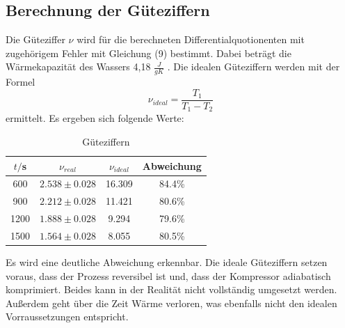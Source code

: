 \subsection{Berechnung der Güteziffern}
Die Güteziffer $\nu$ wird für die berechneten Differentialquotionenten mit zugehörigem Fehler mit Gleichung (9) bestimmt.
Dabei beträgt die Wärmekapazität des Wassers 4,18 $\frac{J}{gK}$ \cite{sample1}.
Die idealen Güteziffern werden mit der Formel
\begin{equation}
  \nu_{ideal} = \frac{T_1}{T_1-T_2}
\end{equation}
ermittelt. Es ergeben sich folgende Werte:
\begin{table}
  \centering
  \caption{Güteziffern}
  \label{tab:Reale und ideale Güteziffern}
  \begin{tabular}{c c c c}
    \toprule
    $t/$s & $\nu_{real}$ & $\nu_{ideal}$ & Abweichung \\
    \midrule
     600 & $2.538 \pm 0.028$ &   16.309 &  84.4\% \\
     900 & $2.212 \pm 0.028$ &   11.421 &  80.6\% \\
    1200 & $1.888 \pm 0.028$ &    9.294 &  79.6\% \\
    1500 & $1.564 \pm 0.028$ &    8.055 &  80.5\% \\
    \bottomrule
  \end{tabular}
\end{table}

Es wird eine deutliche Abweichung erkennbar. Die ideale Güteziffern setzen
voraus, dass der Prozess reversibel ist und, dass der Kompressor adiabatisch
komprimiert. Beides kann in der Realität nicht vollständig umgesetzt werden. Außerdem
geht über die Zeit Wärme verloren, was ebenfalls nicht den idealen Vorraussetzungen entspricht.
